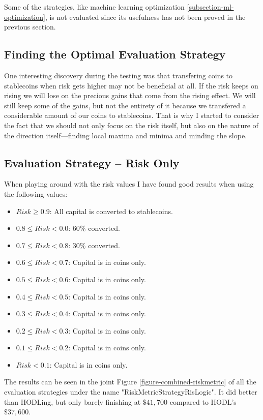 Some of the strategies, like machine learning optimization \ref{subsection-ml-optimization}, is not evaluated since its usefulness has not been proved in the previous section.

\subsection*{Finding the Optimal Evaluation Strategy}
One interesting discovery during the testing was that transfering coins to stablecoins when risk gets higher may not be beneficial at all. If the risk keeps on rising we will lose on the precious gains that come from the rising effect. We will still keep some of the gains, but not the entirety of it because we transfered a considerable amount of our coins to stablecoins. That is why I started to consider the fact that we should not only focus on the risk itself, but also on the nature of the direction itself---finding local maxima and minima and minding the slope.

\subsection*{Evaluation Strategy -- Risk Only}
When playing around with the risk values I have found good results when using the following values:
\begin{itemize}
    \item $Risk \ge  0.9$: All capital is converted to stablecoins.
    \item $0.8 \le Risk < 0.0$: 60\% converted.
    \item $0.7 \le Risk < 0.8$: 30\% converted.
    \item $0.6 \le Risk < 0.7$: Capital is in coins only.
    \item $0.5 \le Risk < 0.6$: Capital is in coins only.
    \item $0.4 \le Risk < 0.5$: Capital is in coins only.
    \item $0.3 \le Risk < 0.4$: Capital is in coins only.
    \item $0.2 \le Risk < 0.3$: Capital is in coins only.
    \item $0.1 \le Risk < 0.2$: Capital is in coins only.
    \item $Risk < 0.1$: Capital is in coins only.
\end{itemize}

The results can be seen in the joint Figure \ref{figure-combined-riskmetric} of all the evaluation strategies under the name "RiskMetricStrategyRisLogic". It did better than HODLing, but only barely finishing at $\$41,700$ compared to HODL's $\$37,600$.

